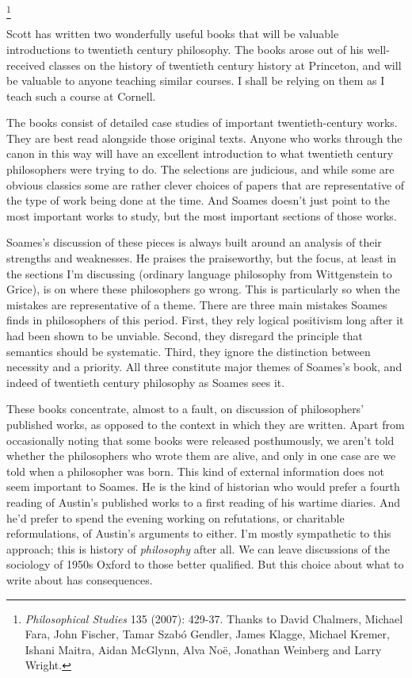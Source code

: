 
\footnote{\textit{Philosophical Studies} 135 (2007): 429-37. Thanks to David Chalmers, Michael Fara, John Fischer, Tamar Szab\'{o} Gendler, James Klagge, Michael Kremer, Ishani Maitra, Aidan McGlynn, Alva No\"{e}, Jonathan Weinberg and Larry Wright.}

Scott \citeauthor{Soames2003} has written two wonderfully useful books that will be valuable introductions to twentieth century philosophy. The books arose out of his well-received classes on the history of twentieth century history at Princeton, and will be valuable to anyone teaching similar courses. I shall be relying on them as I teach such a course at Cornell.

The books consist of detailed case studies of important twentieth-century works. They are best read alongside those original texts. Anyone who works through the canon in this way will have an excellent introduction to what twentieth century philosophers were trying to do. The selections are judicious, and while some are obvious classics some are rather clever choices of papers that are representative of the type of work being done at the time. And Soames doesn't just point to the most important works to study, but the most important sections of those works.

Soames's discussion of these pieces is always built around an analysis of their strengths and weaknesses. He praises the praiseworthy, but the focus, at least in the sections I'm discussing (ordinary language philosophy from Wittgenstein to Grice), is on where these philosophers go wrong. This is particularly so when the mistakes are representative of a theme. There are three main mistakes Soames finds in philosophers of this period. First, they rely logical positivism long after it had been shown to be unviable. Second, they disregard the principle that semantics should be systematic. Third, they ignore the distinction between necessity and a priority. All three constitute major themes of Soames's book, and indeed of twentieth century philosophy as Soames sees it. 

These books concentrate, almost to a fault, on discussion of philosophers' published works, as opposed to the context in which they are written. Apart from occasionally noting that some books were released posthumously, we aren't told whether the philosophers who wrote them are alive, and only in one case are we told when a philosopher was born. This kind of external information does not seem important to Soames. He is the kind of historian who would prefer a fourth reading of Austin's published works to a first reading of his wartime diaries. And he'd prefer to spend the evening working on refutations, or charitable reformulations, of Austin's arguments to either. I'm mostly sympathetic to this approach; this is history of \textit{philosophy} after all. We can leave discussions of the sociology of 1950s Oxford to those better qualified. But this choice about what to write about has consequences.

